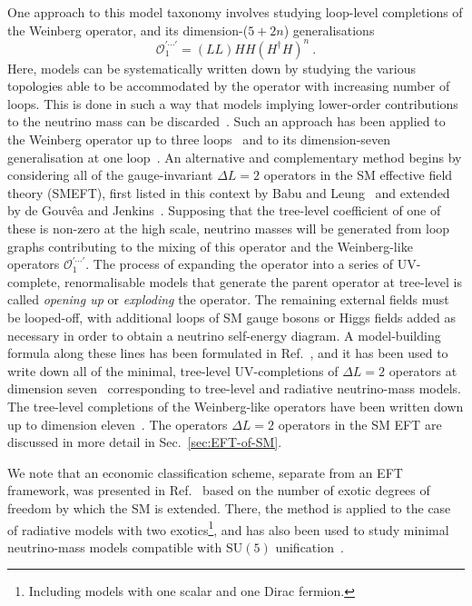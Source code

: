 One approach to this model taxonomy involves studying loop-level completions of
the Weinberg operator, and its dimension-($5+2n$) generalisations
\begin{equation*}
 \mathcal{O}_1^{\prime \cdots \prime} = (LL)HH(H^\dagger H)^n  \ .
\end{equation*}
Here, models can be systematically written down by studying the various
topologies able to be accommodated by the operator with increasing number of
loops. This is done in such a way that models implying lower-order contributions
to the neutrino mass can be discarded~\cite{Farzan:2012ev}. Such an approach has
been applied to the Weinberg operator up to three loops~\cite{Bonnet:2012kz,
  Sierra:2014rxa, Cepedello:2018rfh} and to its dimension-seven generalisation
at one loop~\cite{Cepedello:2017eqf}. An alternative and complementary method
begins by considering all of the gauge-invariant $\Delta L = 2$ operators in the
SM effective field theory (SMEFT), first listed in this context by Babu and
Leung~\cite{Babu:2001ex} and extended by de Gouv\^{e}a and
Jenkins~\cite{deGouvea:2007qla}. Supposing that the tree-level coefficient of
one of these is non-zero at the high scale, neutrino masses will be generated
from loop graphs contributing to the mixing of this operator and the
Weinberg-like operators $\mathcal{O}_1^{\prime \cdots \prime}$. The process of
expanding the operator into a series of UV-complete, renormalisable models that
generate the parent operator at tree-level is called \emph{opening up} or
\emph{exploding} the operator. The remaining external fields must be looped-off,
with additional loops of SM gauge bosons or Higgs fields added as necessary in
order to obtain a neutrino self-energy diagram. A model-building formula along
these lines has been formulated in Ref.~\cite{PhysRevD.87.073007}, and it has
been used to write down all of the minimal, tree-level UV-completions of
$\Delta L = 2$ operators at dimension seven~\cite{Cai:2014kra} corresponding to
tree-level and radiative neutrino-mass models. The tree-level completions of the
Weinberg-like operators have been written down up to dimension
eleven~\cite{Cai:2014kra, Bonnet:2009ej, Anamiati:2018cuq}. The operators
$\Delta L = 2$ operators in the SM EFT are discussed in more detail in
Sec.~\ref{sec:EFT-of-SM}.

We note that an economic classification scheme, separate from an EFT framework,
was presented in Ref.~\cite{Klein:2019iws} based on the number of exotic degrees
of freedom by which the SM is extended. There, the method is applied to the case
of radiative models with two exotics\footnote{Including models with one scalar
  and one Dirac fermion.}, and has also been used to study minimal neutrino-mass
models compatible with $\mathrm{SU}(5)$ unification~\cite{Klein:2019jgb}.

